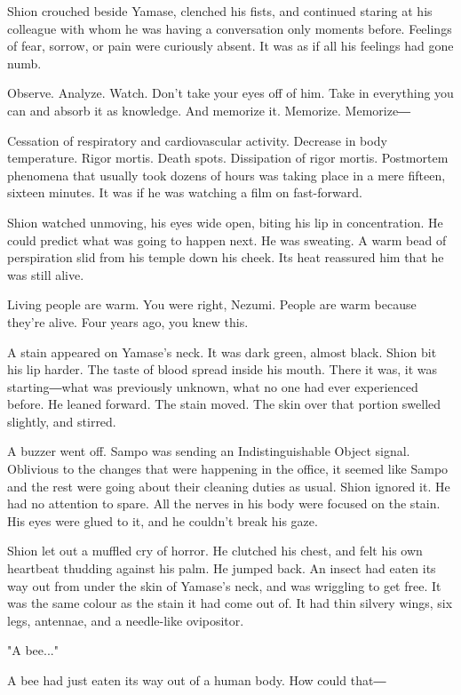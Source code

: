 Shion crouched beside Yamase, clenched his fists, and continued staring
at his colleague with whom he was having a conversation only moments
before. Feelings of fear, sorrow, or pain were curiously absent. It was
as if all his feelings had gone numb.

Observe. Analyze. Watch. Don't take your eyes off of him. Take in
everything you can and absorb it as knowledge. And memorize it.
Memorize. Memorize―

Cessation of respiratory and cardiovascular activity. Decrease in body
temperature. Rigor mortis. Death spots. Dissipation of rigor mortis.
Postmortem phenomena that usually took dozens of hours was taking place
in a mere fifteen, sixteen minutes. It was if he was watching a film on
fast-forward.

Shion watched unmoving, his eyes wide open, biting his lip in
concentration. He could predict what was going to happen next. He was
sweating. A warm bead of perspiration slid from his temple down his
cheek. Its heat reassured him that he was still alive.

Living people are warm. You were right, Nezumi. People are warm because
they're alive. Four years ago, you knew this.

A stain appeared on Yamase's neck. It was dark green, almost black.
Shion bit his lip harder. The taste of blood spread inside his mouth.
There it was, it was starting―what was previously unknown, what no one
had ever experienced before. He leaned forward. The stain moved. The
skin over that portion swelled slightly, and stirred.

A buzzer went off. Sampo was sending an Indistinguishable Object signal.
Oblivious to the changes that were happening in the office, it seemed
like Sampo and the rest were going about their cleaning duties as usual.
Shion ignored it. He had no attention to spare. All the nerves in his
body were focused on the stain. His eyes were glued to it, and he
couldn't break his gaze.

Shion let out a muffled cry of horror. He clutched his chest, and felt
his own heartbeat thudding against his palm. He jumped back. An insect
had eaten its way out from under the skin of Yamase's neck, and was
wriggling to get free. It was the same colour as the stain it had come
out of. It had thin silvery wings, six legs, antennae, and a needle-like
ovipositor.

"A bee..."

A bee had just eaten its way out of a human body. How could that―

